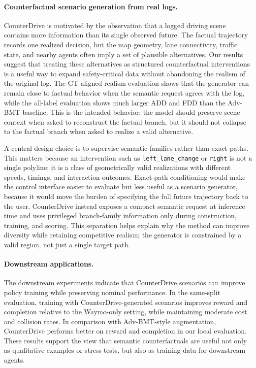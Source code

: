 \documentclass{article}
\begin{document}
\paragraph{Counterfactual scenario generation from real logs.}
CounterDrive is motivated by the observation that a logged driving scene contains more information than its single observed future. The factual trajectory records one realized decision, but the map geometry, lane connectivity, traffic state, and nearby agents often imply a set of plausible alternatives. Our results suggest that treating these alternatives as structured counterfactual interventions is a useful way to expand safety-critical data without abandoning the realism of the original log. The GT-aligned realism evaluation shows that the generator can remain close to factual behavior when the semantic request agrees with the log, while the all-label evaluation shows much larger ADD and FDD than the Adv-BMT baseline. This is the intended behavior: the model should preserve scene context when asked to reconstruct the factual branch, but it should not collapse to the factual branch when asked to realize a valid alternative.

A central design choice is to supervise semantic families rather than exact paths. This matters because an intervention such as \texttt{left\_lane\_change} or \texttt{right} is not a single polyline; it is a class of geometrically valid realizations with different speeds, timings, and interaction outcomes. Exact-path conditioning would make the control interface easier to evaluate but less useful as a scenario generator, because it would move the burden of specifying the full future trajectory back to the user. CounterDrive instead exposes a compact semantic request at inference time and uses privileged branch-family information only during construction, training, and scoring. This separation helps explain why the method can improve diversity while retaining competitive realism; the generator is constrained by a valid region, not just a single target path.


\paragraph{Downstream applications.}
The downstream experiments indicate that CounterDrive scenarios can improve policy training while preserving nominal performance. In the same-split evaluation, training with CounterDrive-generated scenarios improves reward and completion relative to the Waymo-only setting, while maintaining moderate cost and collision rates. In comparison with Adv-BMT-style augmentation, CounterDrive performs better on reward and completion in our local evaluation. These results support the view that semantic counterfactuals are useful not only as qualitative examples or stress tests, but also as training data for downstream agents.
\end{document}
